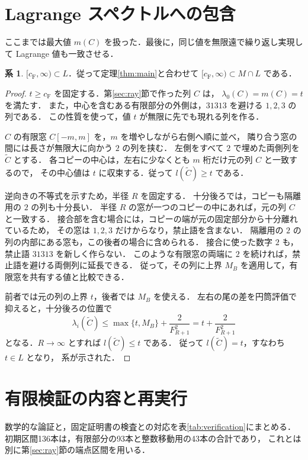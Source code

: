 \documentclass[11pt,a4paper]{article}
\theoremstyle{definition}
\newtheorem{corollary}{系}
\newcommand{\CF}{c_{\mathrm F}}
\begin{document}
\section{Lagrange スペクトルへの包含}\label{sec:L}
ここまでは最大値 $m(C)$ を扱った．最後に，同じ値を無限遠で繰り返し実現して
Lagrange 値も一致させる．
\begin{corollary}\label{cor:L}
$[\CF,\infty)\subset L$．従って定理\ref{thm:main}と合わせて
$[\CF,\infty)\subset M\cap L$ である．
\end{corollary}
\begin{proof}
$t\ge\CF$ を固定する．第\ref{sec:ray}節で作った列 $C$ は，
$\lambda_0(C)=m(C)=t$ を満たす．
また，中心を含むある有限部分の外側は，$31313$ を避ける $1,2,3$ の列である．
この性質を使って，値 $t$ が無限に先でも現れる列を作る．

$C$ の有限窓 $C[-m,m]$ を，$m$ を増やしながら右側へ順に並べ，
隣り合う窓の間には長さが無限大に向かう $2$ の列を挟む．
左側をすべて $2$ で埋めた両側列を $\widetilde C$ とする．
各コピーの中心は，左右に少なくとも $m$ 桁だけ元の列 $C$ と一致するので，
その中心値は $t$ に収束する．従って $l(\widetilde C)\ge t$ である．

逆向きの不等式を示すため，半径 $R$ を固定する．
十分後ろでは，コピーも隔離用の $2$ の列も十分長い．
半径 $R$ の窓が一つのコピーの中にあれば，元の列 $C$ と一致する．
接合部を含む場合には，コピーの端が元の固定部分から十分離れているため，
その窓は $1,2,3$ だけからなり，禁止語を含まない．
隔離用の $2$ の列の内部にある窓も，この後者の場合に含められる．
接合に使った数字 $2$ も，禁止語 $31313$ を新しく作らない．
このような有限窓の両端に $2$ を続ければ，禁止語を避ける両側列に延長できる．
従って，その列に上界 $M_B$ を適用して，有限窓を共有する値と比較できる．

前者では元の列の上界 $t$，後者では $M_B$ を使える．
左右の尾の差を円筒評価で抑えると，十分後ろの位置で
\[
 \lambda_i(\widetilde C)
 \le\max\{t,M_B\}+\frac{2}{F_{R+1}^2}
 =t+\frac{2}{F_{R+1}^2}
\]
となる．$R\to\infty$ とすれば $l(\widetilde C)\le t$ である．
従って $l(\widetilde C)=t$，すなわち $t\in L$ となり，
系が示された．
\end{proof}

\appendix
\section{有限検証の内容と再実行}\label{app:verification}
数学的な論証と，固定証明書の検査との対応を表\ref{tab:verification}にまとめる．
初期区間136本は，有限部分の93本と整数移動用の43本の合計であり，
これとは別に第\ref{sec:ray}節の端点区間を用いる．
\end{document}
